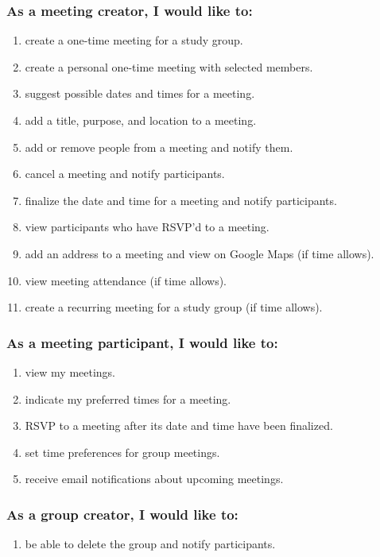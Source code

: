 \documentclass[12pt]{article}
\begin{document}
\subsubsection*{As a meeting creator, I would like to:}

\begin{enumerate}[nolistsep]
    \item create a one-time meeting for a study group.
    \item create a personal one-time meeting with selected members.
    \item suggest possible dates and times for a meeting.
    \item add a title, purpose, and location to a meeting.
    \item add or remove people from a meeting and notify them.
    \item cancel a meeting and notify participants.
    \item finalize the date and time for a meeting and notify participants.
    \item view participants who have RSVP'd to a meeting.
    \item add an address to a meeting and view on Google Maps (if time allows).
    \item view meeting attendance (if time allows).
    \item create a recurring meeting for a study group (if time allows).
\end{enumerate}

\newpage

\subsubsection*{As a meeting participant, I would like to:}

\begin{enumerate}[nolistsep]
    \item view my meetings.
    \item indicate my preferred times for a meeting.
    \item RSVP to a meeting after its date and time have been finalized.
    \item set time preferences for group meetings.
    \item receive email notifications about upcoming meetings.
\end{enumerate}

\subsubsection*{As a group creator, I would like to:}
\begin{enumerate}[nolistsep]
    \item be able to delete the group and notify participants.
\end{enumerate}
\end{document}
